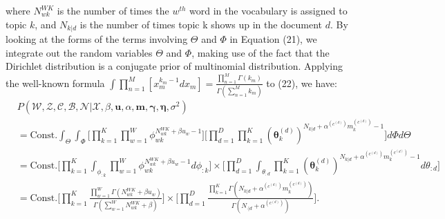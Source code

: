 \documentclass[a4paper]{article}
\begin{document}
  where $N^{WK}_{wk}$ is the number of times the $w^{th}$ word in the vocabulary is assigned to topic $k$, and $N_{k|d}$ is the number of times topic k shows up in the document $d$. By looking at the forms of the terms involving  $\Theta$ and $\Phi$ in Equation (21), we integrate out the random variables $\Theta$ and $\Phi$, making use of the fact that the Dirichlet distribution is a conjugate prior of multinomial distribution. Applying the well-known formula $\int\prod_{n=1}^{M}[x_m^{k_m-1}dx_m]=\frac{\prod_{n=1}^M\Gamma(k_m)}{\Gamma(\sum_{n=1}^Mk_m)}$ to (22), we have:
  \begin{equation}
  \begin{aligned}
  &P(\mathcal{W}, \mathcal{Z}, \mathcal{C}, \mathcal{B}, \mathcal{N}| \mathcal{X}, \beta, \boldsymbol{u}, \alpha, \boldsymbol{m}, \boldsymbol{\gamma}, \boldsymbol{\eta}, \sigma^2)\\&=\mbox{Const.}\int_{\Theta}\int_{\Phi}\Big[\prod_{k=1}^{K}\prod_{w=1}^{W}\phi_{wk}^{N^{WK}_{wk}+\beta u_w-1}\Big]\Big[\prod_{d=1}^{D}\prod_{k=1}^{K}(\boldsymbol{\theta}^{(d)}_{k})^{N_{k|d}+\alpha^{(c^{(d)})} m^{(c^{(d)})} _k-1}\Big]d\Phi d\Theta
  \\&=\mbox{Const.}\Big[\prod_{k=1}^{K}\int_{\phi_{:k}}\prod_{w=1}^{W}\phi_{wk}^{N^{WK}_{wk}+\beta u_w-1  }d\phi_{:k}\Big]\times\Big[\prod_{d=1}^{D}\int_{\theta_{:d}}\prod_{k=1}^{K}(\boldsymbol{\theta}^{(d)}_{k})^{N_{k|d}+\alpha^{(c^{(d)})} m^{(c^{(d)})}_k-1}d\theta_{:d}\Big]
  \\&=\mbox{Const.}\Big[\prod_{k=1}^{K}\frac{\prod_{w=1}^W\Gamma(N_{wk}^{WK}+\beta u_w)}{\Gamma(\sum_{w=1}^WN_{wk}^{WK}+\beta )}\Big]\times\Big[\prod_{d=1}^{D}\frac{\prod_{k=1}^K\Gamma(N_{k|d}+\alpha^{(c^{(d)})} m^{(c^{(d)})}_k)}{\Gamma(N_{\cdot|d}+\alpha^{(c^{(d)})})}\Big].
  \end{aligned}
  \end{equation}
\end{document}
